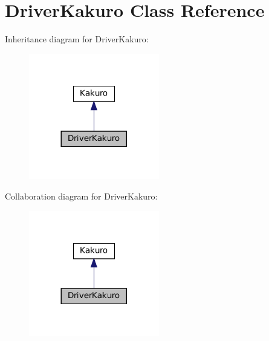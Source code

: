 \section{Driver\+Kakuro Class Reference}
\label{class_dominio_1_1controladores_1_1_drivers_1_1_driver_kakuro}


Inheritance diagram for Driver\+Kakuro\+:
\nopagebreak
\begin{figure}[H]
\begin{center}
\leavevmode
\includegraphics[width=161pt]{class_dominio_1_1controladores_1_1_drivers_1_1_driver_kakuro__inherit__graph}
\end{center}
\end{figure}


Collaboration diagram for Driver\+Kakuro\+:
\nopagebreak
\begin{figure}[H]
\begin{center}
\leavevmode
\includegraphics[width=161pt]{class_dominio_1_1controladores_1_1_drivers_1_1_driver_kakuro__coll__graph}
\end{center}
\end{figure}
